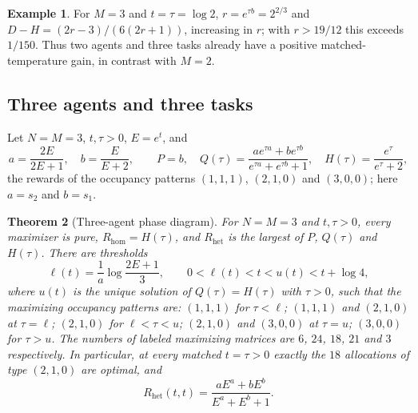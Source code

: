 \documentclass[11pt]{article}
\theoremstyle{plain}
\newtheorem{theorem}{Theorem}[section]
\theoremstyle{definition}
\newtheorem{example}[theorem]{Example}
\theoremstyle{remark}
\newcommand{\Rhet}{R_{\mathrm{het}}}
\newcommand{\Rhom}{R_{\mathrm{hom}}}
\begin{document}
\begin{example}\label{ex:twothree}
For $M=3$ and $t=\tau=\log2$, $r=e^{\tau b}=2^{2/3}$ and $D-H=(2r-3)/(6(2r+1))$, increasing in $r$; with $r>19/12$ this exceeds $1/150$. Thus two agents and three tasks already have a positive matched-temperature gain, in contrast with $M=2$.
\end{example}

\subsection{Three agents and three tasks}\label{sec:threethree}

Let $N=M=3$, $t,\tau>0$, $E=e^t$, and
\[
 a=\frac{2E}{2E+1},\quad b=\frac{E}{E+2},\qquad
 P=b,\quad Q(\tau)=\frac{ae^{\tau a}+be^{\tau b}}{e^{\tau a}+e^{\tau b}+1},\quad H(\tau)=\frac{e^\tau}{e^\tau+2},
\]
the rewards of the occupancy patterns $(1,1,1)$, $(2,1,0)$ and $(3,0,0)$; here $a=s_2$ and $b=s_1$.

\begin{theorem}[Three-agent phase diagram]\label{thm:threethree}
For $N=M=3$ and $t,\tau>0$, every maximizer is pure, $\Rhom=H(\tau)$, and $\Rhet$ is the largest of $P$, $Q(\tau)$ and $H(\tau)$. There are thresholds
\[
 \ell(t)=\frac1a\log\frac{2E+1}3,\qquad 0<\ell(t)<t<u(t)<t+\log4,
\]
where $u(t)$ is the unique solution of $Q(\tau)=H(\tau)$ with $\tau>0$, such that the maximizing occupancy patterns are: $(1,1,1)$ for $\tau<\ell$; $(1,1,1)$ and $(2,1,0)$ at $\tau=\ell$; $(2,1,0)$ for $\ell<\tau<u$; $(2,1,0)$ and $(3,0,0)$ at $\tau=u$; $(3,0,0)$ for $\tau>u$. The numbers of labeled maximizing matrices are $6$, $24$, $18$, $21$ and $3$ respectively. In particular, at every matched $t=\tau>0$ exactly the $18$ allocations of type $(2,1,0)$ are optimal, and
\[
 \Rhet(t,t)=\frac{aE^a+bE^b}{E^a+E^b+1}.
\]
\end{theorem}
\end{document}
